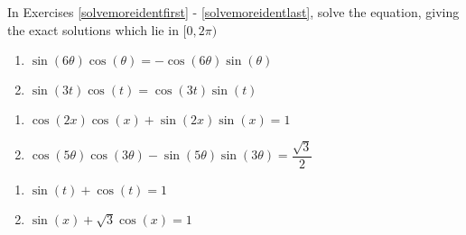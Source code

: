 \documentclass{ximera}
\begin{document}
\pagebreak

In Exercises \ref{solvemoreidentfirst} - \ref{solvemoreidentlast}, solve the equation, giving the exact solutions which lie in $[0, 2\pi)$


\begin{multicols}{2}

\begin{enumerate}

\setcounter{enumi}{\value{HW}}

\item $\sin(6\theta) \cos(\theta) = -\cos(6\theta) \sin(\theta)$ \label{solvemoreidentfirst}
\item  $\sin(3t)\cos(t) = \cos(3t) \sin(t)$

\setcounter{HW}{\value{enumi}}

\end{enumerate}

\end{multicols}

\begin{multicols}{2}

\begin{enumerate}

\setcounter{enumi}{\value{HW}}

\item $\cos(2x)\cos(x) + \sin(2x)\sin(x) = 1$ 
\item \small $\cos(5\theta)\cos(3\theta) - \sin(5\theta)\sin(3\theta) = \dfrac{\sqrt{3}}{2}$ \normalsize

\setcounter{HW}{\value{enumi}}

\end{enumerate}

\end{multicols}

\begin{multicols}{2}

\begin{enumerate}

\setcounter{enumi}{\value{HW}}

\item $\sin(t) + \cos(t) = 1$
\item  $\sin(x) + \sqrt{3} \cos(x) = 1$

\setcounter{HW}{\value{enumi}}

\end{enumerate}

\end{multicols}
\end{document}
